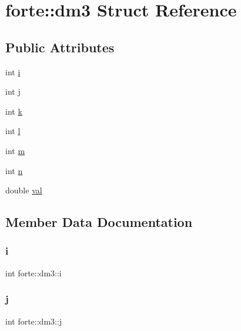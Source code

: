 \hypertarget{structforte_1_1dm3}{}\section{forte\+:\+:dm3 Struct Reference}
\label{structforte_1_1dm3}
\subsection*{Public Attributes}
\begin{DoxyCompactItemize}
\item 
int \mbox{\hyperlink{structforte_1_1dm3_a8c9031d3ec88f12e5b8c92dce6e12de6}{i}}
\item 
int \mbox{\hyperlink{structforte_1_1dm3_ac54397e1eda2beaa9de9694922fbc444}{j}}
\item 
int \mbox{\hyperlink{structforte_1_1dm3_ada31a56207b990eff9662bf12b44f2a7}{k}}
\item 
int \mbox{\hyperlink{structforte_1_1dm3_adc5c51d37c4f9f1b1a84d2bad25ac005}{l}}
\item 
int \mbox{\hyperlink{structforte_1_1dm3_a4c2b5fae81b47c86f292ad99f7c573ac}{m}}
\item 
int \mbox{\hyperlink{structforte_1_1dm3_a8feb5d038920b11b07055922b79ce366}{n}}
\item 
double \mbox{\hyperlink{structforte_1_1dm3_a8548c69e2324672d49f1a221e965df68}{val}}
\end{DoxyCompactItemize}


\subsection{Member Data Documentation}
\mbox{\label{structforte_1_1dm3_a8c9031d3ec88f12e5b8c92dce6e12de6}} 
\subsubsection{\texorpdfstring{i}{i}}
{\footnotesize\ttfamily int forte\+::dm3\+::i}

\mbox{\label{structforte_1_1dm3_ac54397e1eda2beaa9de9694922fbc444}} 
\subsubsection{\texorpdfstring{j}{j}}
{\footnotesize\ttfamily int forte\+::dm3\+::j}

